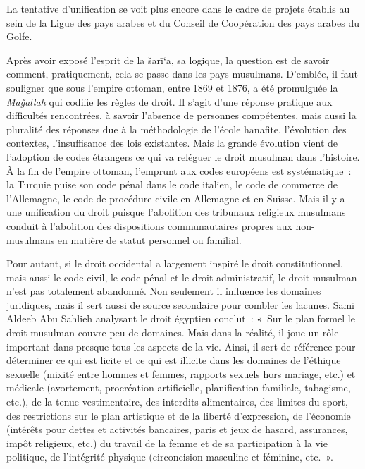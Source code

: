 La tentative d'unification se voit plus encore dans le cadre de projets
établis au sein de la Ligue des pays arabes et du Conseil de Coopération
des pays arabes du Golfe.


Après avoir exposé l'esprit de la šarī`a, sa logique, la question est de
savoir comment, pratiquement, cela se passe dans les pays musulmans.
D'emblée, il faut souligner que sous l'empire ottoman, entre 1869 et
1876, a été promulguée la \emph{Maǧallah} qui codifie les règles de
droit. Il s'agit d'une réponse pratique aux difficultés rencontrées, à
savoir l'absence de personnes compétentes, mais aussi la pluralité des
réponses due à la méthodologie de l'école hanafite, l'évolution des
contextes, l'insuffisance des lois existantes. Mais la grande évolution
vient de l'adoption de codes étrangers ce qui va reléguer le droit
musulman dans l'histoire. À la fin de l'empire ottoman, l'emprunt aux
codes européens est systématique~: la Turquie puise son code pénal dans
le code italien, le code de commerce de l'Allemagne, le code de
procédure civile en Allemagne et en Suisse. Mais il y a une unification
du droit puisque l'abolition des tribunaux religieux musulmans conduit à
l'abolition des dispositions communautaires propres aux non-musulmans en
matière de statut personnel ou familial.

Pour autant, si le droit occidental a largement inspiré le droit
constitutionnel, mais aussi le code civil, le code pénal et le droit
administratif, le droit musulman n'est pas totalement abandonné. Non
seulement il influence les domaines juridiques, mais il sert aussi de
source secondaire pour combler les lacunes. Sami Aldeeb Abu Sahlieh
analysant le droit égyptien conclut~: «~Sur le plan formel le droit
musulman couvre peu de domaines. Mais dans la réalité, il joue un rôle
important dans presque tous les aspects de la vie. Ainsi, il sert de
référence pour déterminer ce qui est licite et ce qui est illicite dans
les domaines de l'éthique sexuelle (mixité entre hommes et femmes,
rapports sexuels hors mariage, etc.) et médicale (avortement,
procréation artificielle, planification familiale, tabagisme, etc.), de
la tenue vestimentaire, des interdits alimentaires, des limites du
sport, des restrictions sur le plan artistique et de la liberté
d'expression, de l'économie (intérêts pour dettes et activités
bancaires, paris et jeux de hasard, assurances, impôt religieux, etc.)
du travail de la femme et de sa participation à la vie politique, de
l'intégrité physique (circoncision masculine et féminine,
etc.~».

